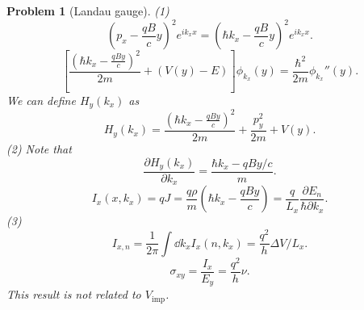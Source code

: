 \documentclass{article}
\theoremstyle{1}
\newtheorem{problem}{Problem}
\newcommand{\pa}{\partial}
\begin{document}
\begin{problem}[Landau gauge]
    (1)
    \begin{equation}
        \left(p_x-\frac{qB}{c}y\right)^2e^{ik_x x}=\left(\hbar k_x-\frac{qB}{c}y\right)^2 e^{ik_x x}.
    \end{equation}
    \begin{equation}
        \left[\frac{\left(\hbar k_x-\frac{qBy}{c}\right)^2}{2m}+(V(y)-E)\right]\phi_{k_x}(y)=\frac{\hbar^2}{2m}\phi_{k_x}''(y).
    \end{equation}
    We can define $H_y(k_x)$ as 
    \begin{equation}
        H_y(k_x)=\frac{\left(\hbar k_x-\frac{qBy}{c}\right)^2}{2m}+\frac{p_y^2}{2m}+V(y).
    \end{equation}
    (2) Note that 
    \begin{equation}
        \frac{\pa H_y(k_x)}{\pa k_x}=\frac{\hbar k_x-qBy/c}{m}.
    \end{equation}
    \begin{equation}
        I_x(x,k_x)=qJ=\frac{q\rho}{m}\left(\hbar k_x-\frac{qBy}{c}\right)=\frac{q}{L_x}\frac{\pa E_n}{\hbar \pa k_x}.
    \end{equation}
    (3) 
    \begin{equation}
    I_{x,n}=\frac{1}{2\pi}\int\dd{k_x}I_x(n,k_x)  =\frac{q^2}{h}\Delta V/L_x. 
    \end{equation}
    \begin{equation}
        \sigma_{xy}=\frac{I_x}{E_y}=\frac{q^2}{h}\nu.
    \end{equation}
    This result is not related to $V_{\text{imp}}$.
\end{problem}
\end{document}
